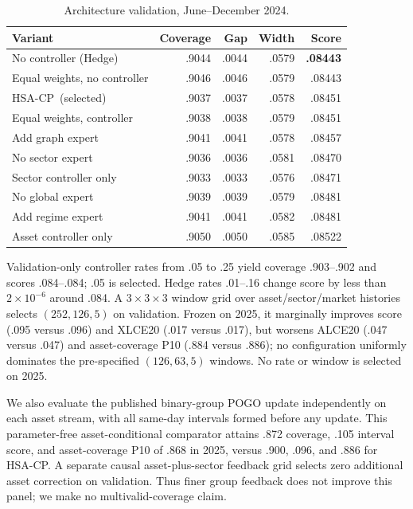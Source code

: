 \documentclass[conference]{IEEEtran}
\newcommand{\method}{HSA-CP}
\begin{document}
\begin{table}[t]
\centering
\caption{Architecture validation, June--December 2024.}
\label{tab:ablation}
\scriptsize
\setlength{\tabcolsep}{3.0pt}
\begin{tabular}{lrrrr}
\toprule
Variant & Coverage & Gap & Width & Score\\
\midrule
No controller (Hedge) & .9044 & .0044 & .0579 & \textbf{.08443}\\
Equal weights, no controller & .9046 & .0046 & .0579 & .08443\\
\method\ (selected) & .9037 & .0037 & .0578 & .08451\\
Equal weights, controller & .9038 & .0038 & .0579 & .08451\\
Add graph expert & .9041 & .0041 & .0578 & .08457\\
No sector expert & .9036 & .0036 & .0581 & .08470\\
Sector controller only & .9033 & .0033 & .0576 & .08471\\
No global expert & .9039 & .0039 & .0579 & .08481\\
Add regime expert & .9041 & .0041 & .0582 & .08481\\
Asset controller only & .9050 & .0050 & .0585 & .08522\\
\bottomrule
\end{tabular}
\end{table}

Validation-only controller rates from .05 to .25 yield coverage .903--.902 and scores .084--.084; .05 is selected. Hedge rates .01--.16 change score by less than $2\times10^{-6}$ around .084. A $3\times3\times3$ window grid over asset/sector/market histories selects $(252,126,5)$ on validation. Frozen on 2025, it marginally improves score (.095 versus .096) and XLCE20 (.017 versus .017), but worsens ALCE20 (.047 versus .047) and asset-coverage P10 (.884 versus .886); no configuration uniformly dominates the pre-specified $(126,63,5)$ windows. No rate or window is selected on 2025.

We also evaluate the published binary-group POGO update \cite{bharti2026group}
independently on each asset stream, with all same-day intervals formed before
any update. This parameter-free asset-conditional comparator attains .872
coverage, .105 interval score, and asset-coverage P10 of .868 in 2025, versus
.900, .096, and .886 for \method. A separate causal asset-plus-sector feedback
grid selects zero additional asset correction on validation. Thus finer group
feedback does not improve this panel; we make no multivalid-coverage claim.
\end{document}
